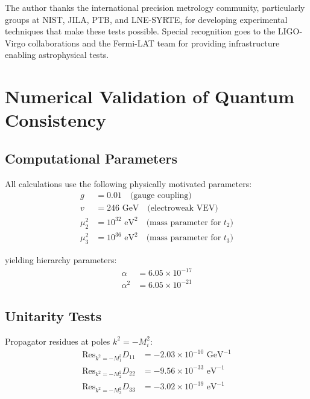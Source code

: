 \documentclass[12pt,a4paper]{article}
\begin{document}
\acknowledgments
The author thanks the international precision metrology community, particularly groups at NIST, JILA, PTB, and LNE-SYRTE, for developing experimental techniques that make these tests possible. Special recognition goes to the LIGO-Virgo collaborations and the Fermi-LAT team for providing infrastructure enabling astrophysical tests.




\newpage
\appendix

\section{Numerical Validation of Quantum Consistency}
\label{app:numerical}

\subsection{Computational Parameters}

All calculations use the following physically motivated parameters:
\begin{align}
g &= 0.01 \quad \text{(gauge coupling)}\\
v &= 246 \text{ GeV} \quad \text{(electroweak VEV)}\\
\mu_2^2 &= 10^{32} \text{ eV}^2 \quad \text{(mass parameter for } t_2\text{)}\\
\mu_3^2 &= 10^{36} \text{ eV}^2 \quad \text{(mass parameter for } t_3\text{)}
\end{align}

yielding hierarchy parameters:
\begin{align}
\alpha &= 6.05 \times 10^{-17}\\
\alpha^2 &= 6.05 \times 10^{-21}
\end{align}

\subsection{Unitarity Tests}

Propagator residues at poles $k^2 = -M_i^2$:
\begin{align}
\text{Res}_{k^2=-M_1^2} D_{11} &= -2.03 \times 10^{-10} \text{ GeV}^{-1}\\
\text{Res}_{k^2=-M_2^2} D_{22} &= -9.56 \times 10^{-33} \text{ eV}^{-1}\\  
\text{Res}_{k^2=-M_3^2} D_{33} &= -3.02 \times 10^{-39} \text{ eV}^{-1}
\end{align}
\end{document}
